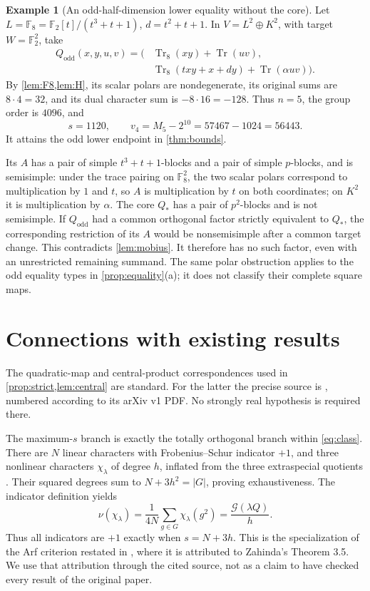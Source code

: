 \documentclass[11pt,a4paper]{article}
\theoremstyle{definition}
\newtheorem{example}[theorem]{Example}
\theoremstyle{remark}
\numberwithin{equation}{section}
\newcommand{\F}{\mathbb F}
\newcommand{\Tr}{\operatorname{Tr}}
\newcommand{\Gauss}{\mathcal G}
\newcommand{\vfour}{v_4}
\newcommand{\Qstar}{Q_*}
\begin{document}
\begin{example}[An odd-half-dimension lower equality without the core]
\label{ex:odd}
Let \(L=\F_8=\F_2[t]/(t^3+t+1)\), \(d=t^2+t+1\).
In \(V=L^2\oplus K^2\), with target \(W=\F_2^2\), take
\begin{align*}
 Q_{\mathrm{odd}}(x,y,u,v)=
 \bigl(&\Tr_8(xy)+\Tr(uv),\\
       &\Tr_8(txy+x+dy)+\Tr(\alpha uv)\bigr).
\end{align*}
By \cref{lem:F8,lem:H}, its scalar polars are nondegenerate,
its original sums are \(8\cdot4=32\), and its dual character sum is
\(-8\cdot16=-128\). Thus \(n=5\), the group order is \(4096\),
and
\[
 s=1120,\qquad \vfour=M_5-2^{10}=57467-1024=56443.
\]
It attains the odd lower endpoint in \cref{thm:bounds}.

Its \(A\) has a pair of simple \(t^3+t+1\)-blocks and a pair of
simple \(p\)-blocks, and is semisimple: under the trace pairing on
\(\F_8^2\), the two scalar polars correspond to multiplication by
\(1\) and \(t\), so \(A\) is multiplication by \(t\) on both
coordinates; on \(K^2\) it is multiplication by \(\alpha\).
The core \(\Qstar\) has a pair of \(p^2\)-blocks and is not semisimple.
If \(Q_{\mathrm{odd}}\) had a common orthogonal factor strictly
equivalent to \(\Qstar\), the corresponding restriction of its \(A\)
would be nonsemisimple after a common target change.
This contradicts \cref{lem:mobius}. It therefore has no such factor,
even with an unrestricted remaining summand.
The same polar obstruction applies to the odd equality types in
\cref{prop:equality}(a); it does not classify their complete square maps.
\end{example}

\section{Connections with existing results}\label{sec:context}
The quadratic-map and central-product correspondences used in
\cref{prop:strict,lem:central} are standard. For the latter the precise
source is \citep[Lemma 2.4, pp.~6--7]{KK12}, numbered according to its
arXiv v1 PDF. No strongly real hypothesis is required there.

The maximum-\(s\) branch is exactly the totally orthogonal branch
within \eqref{eq:class}. There are \(N\) linear characters with
Frobenius--Schur indicator \(+1\), and three nonlinear characters
\(\chi_\lambda\) of degree \(h\), inflated from the three extraspecial
quotients \citep[Proposition 3.5 and Remark 3.6, p.~8]{KK15}.
Their squared degrees sum to \(N+3h^2=|G|\), proving exhaustiveness.
The indicator definition yields
\[
 \nu(\chi_\lambda)
 =\frac1{4N}\sum_{g\in G}\chi_\lambda(g^2)
 =\frac{\Gauss(\lambda Q)}h.
\]
Thus all indicators are \(+1\) exactly when \(s=N+3h\).
This is the specialization of the Arf criterion restated in
\citep[Theorem 4.1, p.~12]{KK12}, where it is attributed to
Zahinda's Theorem 3.5. We use that attribution through the cited source,
not as a claim to have checked every result of the original paper.
\end{document}
